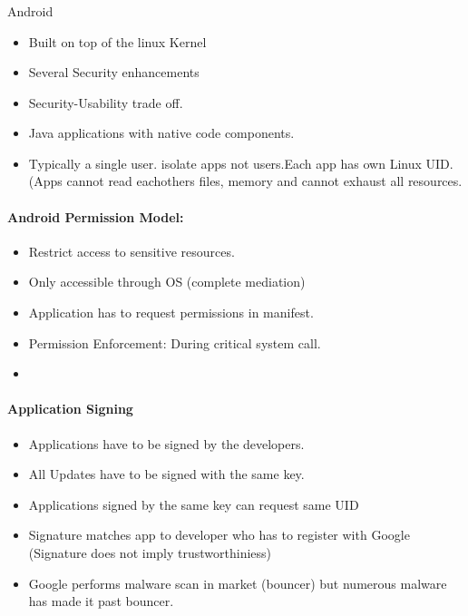 \subsubsection{}{Android}
\begin{itemize}
    \item Built on top of the linux Kernel
    \item Several Security enhancements
    \item Security-Usability trade off.
    \item Java applications with native code components.
    \item Typically a single user. isolate apps not users.Each app has own Linux UID. (Apps cannot read eachothers files, memory and cannot exhaust all resources.
\end{itemize}

\paragraph{Android Permission Model:}
\begin{itemize}
    \item Restrict access to sensitive resources.
    \item Only accessible through OS (complete mediation)
    \item Application has to request permissions in manifest.
    \item Permission Enforcement: During critical system call.
    \item 
\end{itemize}{}

\paragraph{Application Signing}
\begin{itemize}
    \item Applications have to be signed by the developers.
    \item All Updates have to be signed with the same key.
    \item Applications signed by the same key can request same UID
    \item Signature matches app to developer who has to register with Google (Signature does not imply trustworthiniess)
    \item Google performs malware scan in market (bouncer) but numerous malware has made it past bouncer.
\end{itemize}{}

